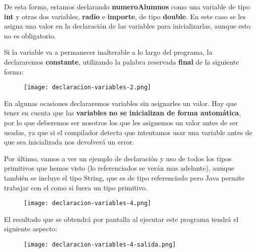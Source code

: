 De esta forma, estamos declarando \textbf{numeroAlumnos} como una variable de tipo \textbf{int} y otras dos variables, \textbf{radio} e \textbf{importe}, de tipo \textbf{double}. En este caso se les asigna una valor en la declaración de las variables para inicializarlas, aunque esto no es obligatorio.

Si la variable va a permanecer inalterable a lo largo del programa, la declararemos \textbf{constante}, utilizando la palabra reservada \textbf{final} de la siguiente forma:

\begin{figure}[H]
    \texttt{[image: declaracion-variables-2.png]}
\end{figure}

En algunas ocasiones declararemos variables sin asignarles un valor. Hay que tener en cuenta que las \textbf{variables} \textbf{no se inicializan de forma automática}, por lo que deberemos ser nosotros los que les asignemos un valor antes de ser usadas, ya que si el compilador detecta que intentamos usar una variable antes de que sea inicializada nos devolverá un error.

Por último, vamos a ver un ejemplo de declaración y uso de todos los tipos primitivos que hemos visto (lo referenciados se verán mas adelante), aunque también se incluye el tipo String, que es de tipo referenciado pero Java permite trabajar con el como si fuera un tipo primitivo.

\begin{figure}[H]
    \texttt{[image: declaracion-variables-4.png]}
\end{figure}

El resultado que se obtendrá por pantalla al ejecutar este programa tendrá el siguiente aspecto:

\begin{figure}[H]
    \texttt{[image: declaracion-variables-4-salida.png]}
\end{figure}




\newpage
{}



